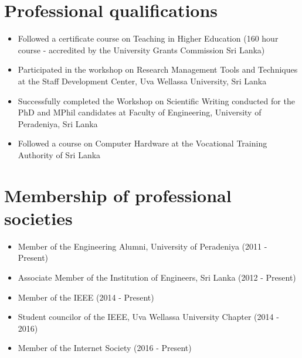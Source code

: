 \documentclass[11pt,a4paper,scan]{moderncv}        %
\begin{document}
\section{Professional qualifications}
\begin{itemize}
	\item Followed a certificate course on Teaching in Higher Education (160 hour course - accredited by the University Grants Commission Sri Lanka)
	
	\vspace{6pt}
	
	\item Participated in the workshop on Research Management Tools and Techniques at the Staff Development Center, Uva Wellassa University, Sri Lanka
	
	\vspace{6pt}
	
	\item Successfully completed the Workshop on Scientific Writing conducted for the PhD and MPhil candidates at Faculty of Engineering, University of Peradeniya, Sri Lanka
	
	\vspace{6pt}
	
	\item Followed a course on Computer Hardware at the Vocational Training Authority of Sri Lanka
\end{itemize}
\section{Membership of professional societies}
\begin{itemize}
	\item Member of the Engineering Alumni, University of Peradeniya (2011 - Present)
	
		\vspace{2pt}
		
	\item Associate Member of the Institution of Engineers, Sri Lanka (2012 - Present)
	
		\vspace{2pt}
		
	\item Member of the IEEE (2014 - Present)
	
		\vspace{2pt}
		
	\item Student councilor of the IEEE, Uva Wellassa University Chapter (2014 - 2016)
	
	 \vspace{2pt}
	 
	 \item Member of the Internet Society (2016 - Present)
\end{itemize}
\end{document}
